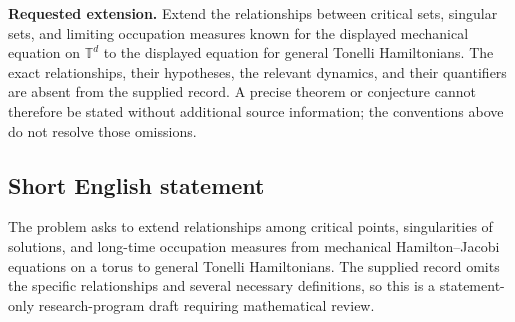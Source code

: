 \documentclass[11pt]{article}
\begin{document}
\textbf{Requested extension.} Extend the relationships between critical sets, singular sets, and limiting occupation measures known for the displayed mechanical equation on \(\mathbb T^d\) to the displayed equation for general Tonelli Hamiltonians. The exact relationships, their hypotheses, the relevant dynamics, and their quantifiers are absent from the supplied record. A precise theorem or conjecture cannot therefore be stated without additional source information; the conventions above do not resolve those omissions.
\subsection{Short English statement}
The problem asks to extend relationships among critical points, singularities of solutions, and long-time occupation measures from mechanical Hamilton--Jacobi equations on a torus to general Tonelli Hamiltonians. The supplied record omits the specific relationships and several necessary definitions, so this is a statement-only research-program draft requiring mathematical review.
\end{document}
